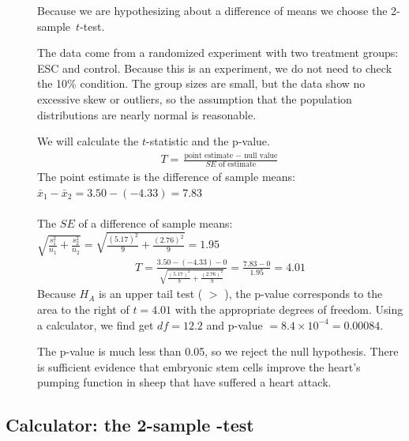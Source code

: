 \begin{examplewrap}
\begin{nexample}
\begin{description}
\item[] Because we are hypothesizing about a difference of means we choose the \mbox{2-sample $t$-test.}
\item[]  The data come from a randomized experiment with two treatment groups: ESC and control.  Because this is an experiment, we do not need to check the 10\% condition.  The group sizes are small, but the data show no excessive skew or outliers, so the assumption that the population distributions are nearly normal is reasonable.
\item[  ]  We will calculate the $t$-statistic and the p-value.
\begin{align*}
T = \frac{\text{point estimate } - \text{ null value}}{SE \text{ of estimate}}
\end{align*}
The point estimate is the difference of sample means: $ \bar{x}_{1} - \bar{x}_{2}=3.50 - (-4.33) = 7.83$\\
\\
The $SE$ of a difference of sample means: $\sqrt{\frac{s_1^2}{n_1} + \frac{s_2^2}{n_2}}= \sqrt{\frac{(5.17)^2}{9} + \frac{(2.76)^2}{9}} = 1.95$
\begin{align*}
T = \frac{3.50 - (-4.33) - 0}{\sqrt{\frac{(5.17)^2}{9} + \frac{(2.76)^2}{9}} } = \frac{7.83 - 0}{1.95} = 4.01 
\end{align*}
Because $H_A$ is an upper tail test ( $>$ ), the p-value corresponds to the area to the right of $t=4.01$ with the appropriate degrees of freedom.  Using a calculator, we find get $df=12.2$ and p-value $ = 8.4\times 10^{-4}=0.00084$.  
\item[]  The p-value is much less than 0.05, so we reject the null hypothesis. There is sufficient evidence that embryonic stem cells improve the heart's pumping function in sheep that have suffered a heart attack.

\end{description}

\end{nexample}
\end{examplewrap}


\D{\newpage}

\subsection[Calculator: the 2-sample $t$-test]{Calculator: the 2-sample -test}
\label{2SampTtest}

